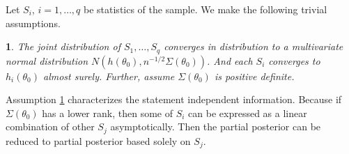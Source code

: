 \documentclass[oneside,english]{amsbook}
\numberwithin{section}{chapter}
\numberwithin{equation}{section}
\numberwithin{figure}{section}
\theoremstyle{plain}
\theoremstyle{plain}
\newtheorem{assumption}{\protect\assumptionname}
\theoremstyle{definition}
\theoremstyle{plain}
\theoremstyle{plain}
\theoremstyle{remark}
\theoremstyle{definition}
\theoremstyle{definition}
\providecommand{\assumptionname}{Assumption}
\begin{document}
Let $S_{i}$, $i=1,\ldots,q$ be statistics of the sample. We make
the following trivial assumptions. 
\begin{assumption}
\label{assu:joint-normal-inconsist-stat}The joint distribution of
$S_{1},\ldots,S_{q}$ converges in distribution to a multivariate
normal distribution $N\left(h\left(\theta_{0}\right),n^{-1/2}\Sigma\left(\theta_{0}\right)\right)$.
And each $S_{i}$ converges to $h_{i}\left(\theta_{0}\right)$ almost
surely. Further, assume $\Sigma\left(\theta_{0}\right)$ {{}
} {is } positive definite. 
\end{assumption}
Assumption \ref{assu:joint-normal-inconsist-stat} characterizes the
statement independent information. Because if $\Sigma\left(\theta_{0}\right)$
has a lower rank, then some of $S_{i}$ can be expressed as  {a
}linear combination of {{} } {other } $S_{j}$
asymptotically. Then the partial posterior can be reduced to partial
posterior based solely on $S_{j}$.
\end{document}
